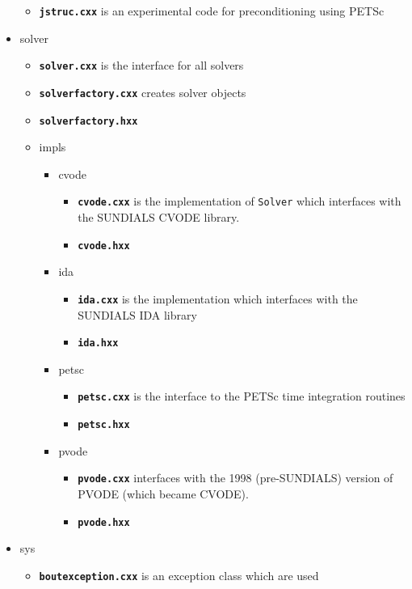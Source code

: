 \documentclass[12pt]{article}
\newcommand{\code}[1]{\texttt{#1}}
\newcommand{\file}[1]{\texttt{\bf #1}}
\begin{document}
\begin{itemize}
  \begin{itemize}
  \item \file{jstruc.cxx} is an experimental code for preconditioning using
    PETSc
  \end{itemize}
\item solver
  \begin{itemize}
  \item \file{solver.cxx} is the interface for all solvers 
  \item \file{solverfactory.cxx} creates solver objects
  \item \file{solverfactory.hxx}
  \item impls
    \begin{itemize}
    \item cvode
      \begin{itemize}
      \item \file{cvode.cxx} is the implementation of \code{Solver} which
        interfaces with the SUNDIALS CVODE library.
      \item \file{cvode.hxx}
      \end{itemize}
    \item ida
      \begin{itemize}
      \item \file{ida.cxx} is the implementation which interfaces with the
        SUNDIALS IDA library
      \item \file{ida.hxx}
      \end{itemize}
    \item petsc
      \begin{itemize}
      \item \file{petsc.cxx} is the interface to the PETSc time integration
        routines
      \item \file{petsc.hxx}
      \end{itemize}
    \item pvode
      \begin{itemize}
      \item \file{pvode.cxx} interfaces with the 1998 (pre-SUNDIALS) version
        of PVODE (which became CVODE).
      \item \file{pvode.hxx}
      \end{itemize}
    \end{itemize}
  \end{itemize}
\item sys
  \begin{itemize}
  \item \file{boutexception.cxx} is an exception class which are used

\end{itemize}
\end{itemize}
\end{document}
